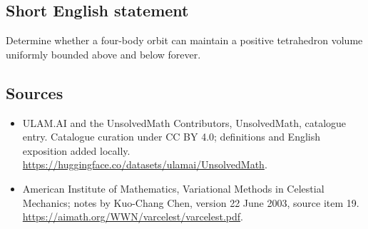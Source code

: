 \documentclass[11pt]{article}
\begin{document}
\subsection{Short English statement}
Determine whether a four-body orbit can maintain a positive tetrahedron volume uniformly bounded above and below forever.
\subsection{Sources}
\begin{itemize}
\item[\hypertarget{source:statement:1}{S1}] ULAM.AI and the UnsolvedMath Contributors, UnsolvedMath, catalogue entry. Catalogue curation under CC BY 4.0; definitions and English exposition added locally.
\url{https://huggingface.co/datasets/ulamai/UnsolvedMath}.
\item[\hypertarget{source:statement:2}{S2}] American Institute of Mathematics, Variational Methods in Celestial Mechanics; notes by Kuo-Chang Chen, version 22 June 2003, source item 19.
\url{https://aimath.org/WWN/varcelest/varcelest.pdf}.
\end{itemize}
\label{end:statement}
\end{document}
